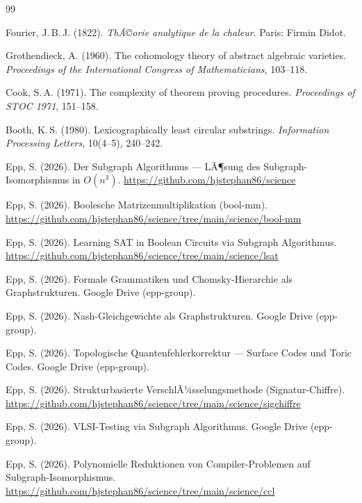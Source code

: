 ﻿\documentclass[a4paper,12pt]{article}
\theoremstyle{definition}
\begin{document}
\begin{thebibliography}{99}

Fourier, J.\,B.\,J. (1822).
\textit{ThÃ©orie analytique de la chaleur}.
Paris: Firmin Didot.

Grothendieck, A. (1960).
The cohomology theory of abstract algebraic varieties.
\textit{Proceedings of the International Congress of Mathematicians}, 103--118.

Cook, S.\,A. (1971).
The complexity of theorem proving procedures.
\textit{Proceedings of STOC 1971}, 151--158.

Booth, K.\,S. (1980).
Lexicographically least circular substrings.
\textit{Information Processing Letters}, 10(4--5), 240--242.

Epp, S. (2026).
Der Subgraph Algorithmus --- LÃ¶sung des Subgraph-Isomorphismus in $O(n^3)$.
\url{https://github.com/hjstephan86/science}

Epp, S. (2026).
Boolesche Matrizenmultiplikation (bool-mm).
\url{https://github.com/hjstephan86/science/tree/main/science/bool-mm}

Epp, S. (2026).
Learning SAT in Boolean Circuits via Subgraph Algorithmus.
\url{https://github.com/hjstephan86/science/tree/main/science/lsat}

Epp, S. (2026).
Formale Grammatiken und Chomsky-Hierarchie als Graphstrukturen.
Google Drive (epp-group).

Epp, S. (2026).
Nash-Gleichgewichte als Graphstrukturen.
Google Drive (epp-group).

Epp, S. (2026).
Topologische Quantenfehlerkorrektur --- Surface Codes und Toric Codes.
Google Drive (epp-group).

Epp, S. (2026).
Strukturbasierte VerschlÃ¼sselungsmethode (Signatur-Chiffre).
\url{https://github.com/hjstephan86/science/tree/main/science/sigchiffre}

Epp, S. (2026).
VLSI-Testing via Subgraph Algorithmus.
Google Drive (epp-group).

Epp, S. (2026).
Polynomielle Reduktionen von Compiler-Problemen auf Subgraph-Isomorphismus.
\url{https://github.com/hjstephan86/science/tree/main/science/ccl}


\end{thebibliography}
\end{document}
